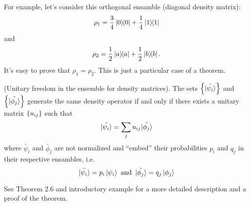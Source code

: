 For example, let's consider this orthogonal ensamble (diagonal density matrix):
\[
  \rho_1 = \frac{3}{4}\ketbra{0}{0} + \frac{1}{4}\ketbra{1}{1}
\]
and
\[
  \rho_2 = \frac{1}{2}\ketbra{a}{a} + \frac{1}{2}\ketbra{b}{b}\text{.}
\]
It's easy to prove that $\rho_1 = \rho_2$. This is just a particular
case of a theorem.
\begin{theorem}{(Unitary freedom in the ensemble for density matrices).}
  The sets $\left\{\tilde{\ket{\psi_i}}\right\}$ and $\left\{\tilde{\ket{\phi_j}}\right\}$
  generate the same density operator if and only if there exists
  a unitary matrix $\left\{u_{ij}\right\}$ such that
  \[
    \tilde{\ket{\psi_i}} = \sum_j u_{ij}\tilde{\ket{\phi_j}}
  \]
  where $\tilde{\psi_i}$ and $\tilde{\phi_j}$ are not normalized and
  ``embed'' their probabilities $p_i$ and $q_j$ in their respective ensambles,
  i.e.
  \[
    \tilde{\ket{\psi_i}} = p_{i}\ket{\psi_i}
    \text{ and }\,
    \tilde{\ket{\phi_j}} = q_{j}\ket{\phi_j}
  \]
\end{theorem}
See \cite{NielsenChuang}{Theorem 2.6 and introductory example}
for a more detailed description and a proof of the theorem.
